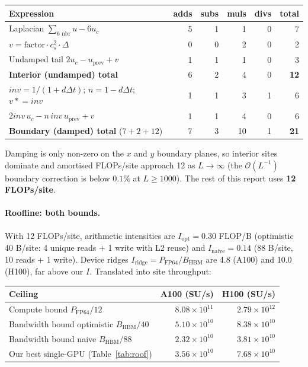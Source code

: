 \documentclass[10pt,a4paper]{article}
\begin{document}
\begin{center}\small
\begin{tabular}{@{}lrrrrr@{}}
\toprule
Expression & adds & subs & muls & divs & total \\
\midrule
Laplacian $\sum_{6\text{ nbr}}u - 6u_c$              & 5 & 1 & 1 & 0 & 7 \\
$v = \text{factor}\cdot c_s^2 \cdot \Delta$          & 0 & 0 & 2 & 0 & 2 \\
Undamped tail $2u_c - u_{\text{prev}} + v$           & 1 & 1 & 1 & 0 & 3 \\
\midrule
\textbf{Interior (undamped) total}                   & 6 & 2 & 4 & 0 & \textbf{12} \\
\midrule
$\mathit{inv}{=}1/(1{+}d\Delta t)$; $n{=}1{-}d\Delta t$; $v\mathrel{*}{=}\mathit{inv}$ & 1 & 1 & 3 & 1 & 6 \\
$2\mathit{inv}\,u_c - n\,\mathit{inv}\,u_{\text{prev}} + v$ & 1 & 1 & 4 & 0 & 6 \\
\midrule
\textbf{Boundary (damped) total} ($7{+}2{+}12$)      & 7 & 3 & 10 & 1 & \textbf{21} \\
\bottomrule
\end{tabular}
\end{center}

Damping is only non-zero on the $x$ and $y$ boundary planes, so interior sites dominate and amortised FLOPs/site approach 12 as $L{\to}\infty$ (the $\mathcal{O}(L^{-1})$ boundary correction is below $0.1\%$ at $L\!\geq\!1000$). The rest of this report uses \textbf{12 FLOPs/site}.

\paragraph{Roofline: both bounds.}
\label{par:roof}
With 12 FLOPs/site, arithmetic intensities are $I_{\text{opt}}{=}0.30$ FLOP/B (optimistic 40 B/site: 4 unique reads + 1 write with L2 reuse) and $I_{\text{naive}}{=}0.14$ (88 B/site, 10 reads + 1 write). Device ridges $I_{\text{ridge}}{=}P_{\text{FP64}}/B_{\text{HBM}}$ are 4.8 (A100) and 10.0 (H100), far above our $I$. Translated into site throughput:

\begin{center}
\begin{tabular}{@{}lrr@{}}
\toprule
Ceiling & A100 (SU/s) & H100 (SU/s) \\
\midrule
Compute bound $P_{\text{FP64}}/12$                  & $8.08\!\times\!10^{11}$ & $2.79\!\times\!10^{12}$ \\
Bandwidth bound optimistic $B_{\text{HBM}}/40$      & $5.10\!\times\!10^{10}$ & $8.38\!\times\!10^{10}$ \\
Bandwidth bound naive $B_{\text{HBM}}/88$           & $2.32\!\times\!10^{10}$ & $3.81\!\times\!10^{10}$ \\
Our best single-GPU (Table~\ref{tab:roof})          & $3.56\!\times\!10^{10}$ & $7.68\!\times\!10^{10}$ \\
\bottomrule
\end{tabular}
\end{center}
\end{document}
